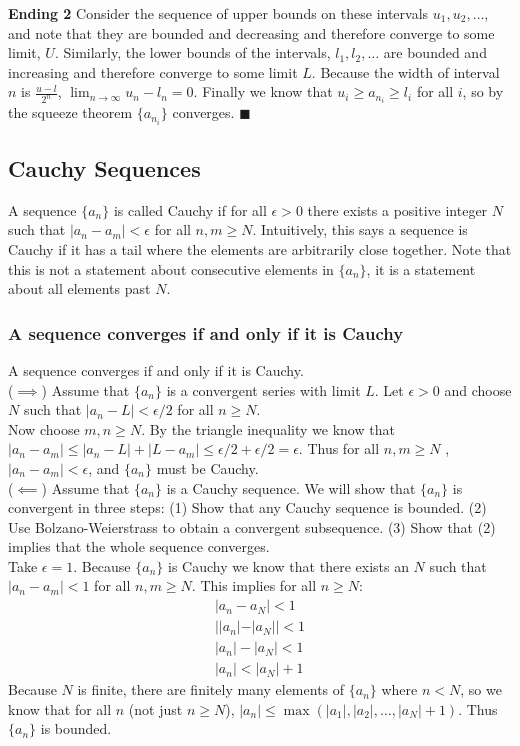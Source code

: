     \textbf{Ending 2} Consider the sequence of upper bounds on these intervals $u_1, u_2, \ldots$,
    and note that they are bounded and decreasing and therefore converge to some limit, $U$. 
    Similarly, the lower bounds of the intervals, $l_1, l_2, \ldots$ are bounded and increasing
    and therefore converge to some limit $L$. Because the width of interval $n$ is
    $\frac{u-l}{2^n}$, $\lim_{n \to \infty} u_n - l_n = 0$. Finally we know that $u_i \geq 
    a_{n_i} \geq l_i$ for all $i$, so by the squeeze theorem $\{a_{n_i}\}$ converges. 
    $\blacksquare$
  \subsection{Cauchy Sequences}
    A sequence $\{a_n\}$ is called Cauchy if for all $\epsilon > 0$ there exists a positive 
    integer $N$ such that $|a_n - a_m| < \epsilon$ for all $n, m \geq N$. Intuitively, this
    says a sequence is Cauchy if it has a tail where the elements are arbitrarily close 
    together. Note that this is not a statement about consecutive elements in $\{a_n\}$, it is
    a statement about all elements past $N$.
  \subsubsection{A sequence converges if and only if it is Cauchy}
    \thm A sequence converges if and only if it is Cauchy.\\

    \pf ($\implies$) Assume that $\{a_n\}$ is a convergent series with limit $L$. Let 
    $\epsilon > 0$ and choose $N$ such that $|a_n - L| < \epsilon/2$ for all $n \geq N$.\\

    Now choose $m,n \geq N$. By the triangle inequality we know that $|a_n - a_m| \leq
    |a_n - L| + |L - a_m| \leq \epsilon/2 + \epsilon/2 = \epsilon$. Thus for all $n, m\geq N$
    , $|a_n - a_m| < \epsilon$, and $\{a_n\}$ must be Cauchy.\\

    ($\impliedby$) Assume that $\{a_n\}$ is a Cauchy sequence. We will show that $\{a_n\}$ is
    convergent in three steps: (1) Show that any Cauchy sequence is bounded. (2) Use 
    Bolzano-Weierstrass to obtain a convergent subsequence. (3) Show that (2) implies that 
    the whole sequence converges.\\

    Take $\epsilon = 1$. Because $\{a_n\}$ is Cauchy we know that there exists an $N$ such
    that $|a_n - a_m| < 1$ for all $n, m \geq N$. This implies for all $n \geq N$:
    \begin{align*}
      |a_n - a_N| < 1\\
      ||a_n| - |a_N|| < 1\\
      |a_n| - |a_N| < 1\\
      |a_n| <  |a_N| + 1
    \end{align*}
    Because $N$ is finite, there are finitely many elements of $\{a_n\}$ where $n < N$, so we
    know that for all $n$ (not just $n \geq N$), $|a_n| \leq \max(|a_1|,|a_2|,\ldots,
    |a_N|+1)$. Thus $\{a_n\}$ is bounded.\\

